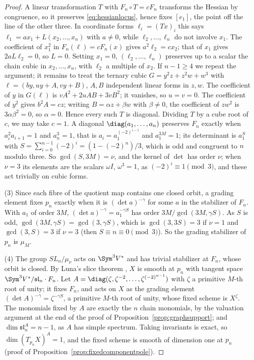 \begin{proof}
A linear transformation $T$ with $F_n\circ T=cF_n$ transforms the Hessian by
congruence, so it preserves \eqref{eq:hessianlocus}, hence fixes $[e_1]$, the
point off the line of the other three. In coordinate forms $\ell_i=(Tx)_i$
this says $\ell_1=ax_1+L(x_2,\dots,x_n)$ with $a\ne0$, while $\ell_2,\dots,
\ell_n$ do not involve $x_1$. The coefficient of $x_1^2$ in
$F_n(\ell)=cF_n(x)$ gives $a^2\ell_2=cx_2$; that of $x_1$ gives $2aL\ell_2=0$,
so $L=0$. Setting $x_1=0$, $(\ell_2,\dots,\ell_n)$ preserves up to a scalar the
chain cubic in $x_2,\dots,x_n$, with $\ell_2$ a multiple of $x_2$. If $n-1\ge4$
we repeat the argument; it remains to treat the ternary cubic
$G=y^2z+z^2w+w^3$ with $\ell=(by,uy+A,vy+B)$, $A,B$ independent linear forms
in $z,w$. The coefficient of $y$ in $G(\ell)$ is $vA^2+2uAB+3vB^2$; it
vanishes, so $u=v=0$. The coefficient of $y^2$ gives $b^2A=cz$; writing
$B=\alpha z+\beta w$ with $\beta\ne0$, the coefficient of $zw^2$ is
$3\alpha\beta^2=0$, so $\alpha=0$. Hence every such $T$ is diagonal. Dividing $T$ by a cube root of $c$, we may
take $c=1$. A diagonal $\diag(a_1,\dots,a_n)$ preserves $F_n$ exactly when $a_i^2a_{i+1}=1$
and $a_n^3=1$, that is $a_i=a_1^{(-2)^{i-1}}$ and $a_1^{3M}=1$; its
determinant is $a_1^S$ with $S=\sum_{i=0}^{n-1}(-2)^i=(1-(-2)^n)/3$, which is
odd and congruent to $n$ modulo three. So $\gcd(S,3M)=\nu$, and the kernel of
$\det$ has order $\nu$; when $\nu=3$ its elements are the scalars
$\omega I$, $\omega^3=1$, as $(-2)^i\equiv1\pmod3$, and these act trivially on
cubic forms.

(3) Since each fibre of the quotient map contains one closed orbit, a grading
element fixes $p_n$ exactly when it is $(\det a)^{-\gamma}$ for some $a$ in the
stabilizer of $F_n$. With $a_1$ of order $3M$, $(\det a)^{-\gamma}=
a_1^{-\gamma S}$ has order $3M/\gcd(3M,\gamma S)$. As $S$ is odd,
$\gcd(3M,\gamma S)=\gcd(3,\gamma S)$, which is $\gcd(3,3S)=3$ if $\nu=1$ and
$\gcd(3,S)=3$ if $\nu=3$ (then $S\equiv n\equiv0\pmod3$). So the grading
stabilizer of $p_n$ is $\mu_M$.

(4) The group $SL_n/\mu_\nu$ acts on $\Sym^3V^*$ and has trivial stabilizer at
$F_n$, whose orbit is closed. By Luna's slice theorem \cite[Section III.1,
Th\'eor\`eme du slice \'etale and Remarque 1$^\circ$, pp.~97--98]{Luna}, $X$ is smooth at $p_n$ with tangent space
$\Sym^3V^*/\mathfrak{sl}_n\cdot F_n$. Let $A=\diag(\zeta,\zeta^{-2},\dots,
\zeta^{(-2)^{n-1}})$ with $\zeta$ a primitive $M$-th root of unity; it fixes
$F_n$, and acts on $X$ as the grading element $(\det A)^{-\gamma}=\zeta^{-\gamma
S}$, a primitive $M$-th root of unity, whose fixed scheme is $X^\zeta$. The
monomials fixed by $A$ are exactly the $n$ chain monomials, by the valuation
argument at the end of the proof of Proposition~\ref{prop:graphsupport}; and
$\dim\mathfrak{sl}_n^A=n-1$, as $A$ has simple spectrum. Taking invariants is
exact, so $\dim(T_{p_n}X)^A=1$, and the fixed scheme is smooth of dimension one
at $p_n$ (proof of Proposition~\ref{prop:fixedcomponentpole}).
\end{proof}

